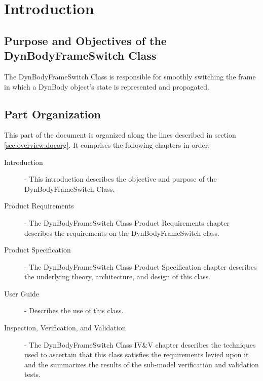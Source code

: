 %
\chapter{Introduction}\label{ch:DynBodyFrameSwitch:intro}

\section{Purpose and Objectives of the
DynBodyFrameSwitch Class}

The DynBodyFrameSwitch Class
is responsible for smoothly switching
the frame in which a DynBody object's
state is represented and propagated.

\section{Part Organization}
This part of the \ModelDesc document is organized along the
lines described in section \ref{sec:overview:docorg}. It
comprises the following chapters in order:

\begin{description}
\item[Introduction] -
This introduction describes the objective and purpose of the
DynBodyFrameSwitch Class.

\item[Product Requirements] -
The DynBodyFrameSwitch Class Product Requirements chapter
describes the requirements on the DynBodyFrameSwitch class.

\item[Product Specification] -
The DynBodyFrameSwitch Class Product Specification chapter
describes the underlying theory, architecture, and design of
this class.

\item[User Guide] -
Describes the use of this class.

\item[Inspection, Verification, and Validation] -
The DynBodyFrameSwitch Class IV\&V chapter
describes the techniques used to ascertain that
this class satisfies the requirements levied upon it
and the summarizes the results of
the sub-model verification and validation tests.
\end{description}
